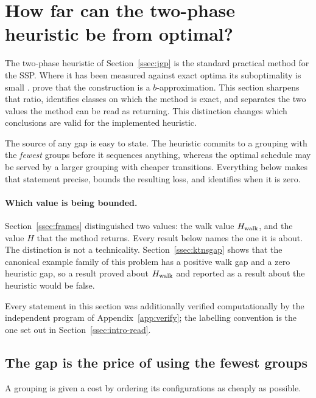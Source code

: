 \section{How far can the two-phase heuristic be from optimal?}\label{sec:gap}

The two-phase heuristic of Section~\ref{ssec:jgp} is the standard practical method
for the SSP. Where it has been measured against exact optima its suboptimality is
small \citep{Burger2015}. \citet{CramaKlundert1999} prove that the construction is a
$b$-approximation. This section sharpens that ratio, identifies classes on which the
method is exact, and separates the two values the method can be read as returning. This
distinction changes which conclusions are valid for the implemented heuristic.

The source of any gap is easy to state. The heuristic commits to a grouping with the
\emph{fewest} groups before it sequences anything, whereas the optimal schedule may
be served by a larger grouping with cheaper transitions. Everything below makes that
statement precise, bounds the resulting loss, and identifies when it is zero.

\paragraph{Which value is being bounded.}
Section~\ref{ssec:frames} distinguished two values: the walk value $H_{\mathrm{walk}}$, and the
value $H$ that the method returns. Every result below names the one it is about. The
distinction is not a technicality. Section~\ref{ssec:ktnsgap} shows that the
canonical example family of this problem has a positive walk gap and a zero
heuristic gap, so a result proved about $H_{\mathrm{walk}}$ and reported as a result about the
heuristic would be false.

Every statement in this section was additionally verified computationally by the
independent program of Appendix~\ref{app:verify}; the labelling convention is the one
set out in Section~\ref{ssec:intro-read}.

\subsection{The gap is the price of using the fewest groups}\label{ssec:exact}

A grouping is given a cost by ordering its configurations as cheaply as possible.

